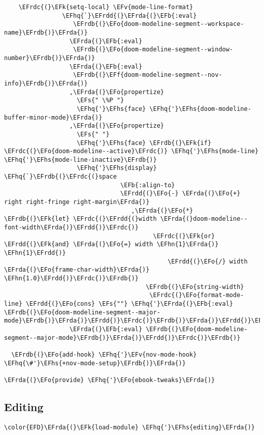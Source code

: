 \documentclass[a4wide,10pt]{article}
\newcommand{\EFs}[1]{\textcolor{EFs}{#1}} %
\newcommand{\EFk}[1]{\textcolor{EFk}{#1}} %
\newcommand{\EFb}[1]{\textcolor{EFb}{#1}} %
\newcommand{\EFf}[1]{\textcolor{EFf}{#1}} %
\newcommand{\EFv}[1]{\textcolor{EFv}{#1}} %
\newcommand{\EFo}[1]{\textcolor{EFo}{#1}} %
\newcommand{\EFhn}[1]{\textcolor{EFhn}{\textbf{#1}}} %
\newcommand{\EFhq}[1]{\textcolor{EFhq}{#1}} %
\newcommand{\EFhs}[1]{\textcolor{EFhs}{#1}} %
\newcommand{\EFrda}[1]{\textcolor{EFrda}{#1}} %
\newcommand{\EFrdb}[1]{\textcolor{EFrdb}{#1}} %
\newcommand{\EFrdc}[1]{\textcolor{EFrdc}{#1}} %
\newcommand{\EFrdd}[1]{\textcolor{EFrdd}{#1}} %
\begin{document}
\begin{Code}
\begin{Verbatim}
    \EFrdc{(}\EFk{setq-local} \EFv{mode-line-format}
                \EFhq{`}\EFrdd{(}\EFrda{(}\EFb{:eval}
                   \EFrdb{(}\EFo{doom-modeline-segment--workspace-name}\EFrdb{)}\EFrda{)}
                  \EFrda{(}\EFb{:eval}
                   \EFrdb{(}\EFo{doom-modeline-segment--window-number}\EFrdb{)}\EFrda{)}
                  \EFrda{(}\EFb{:eval}
                   \EFrdb{(}\EFf{doom-modeline-segment--nov-info}\EFrdb{)}\EFrda{)}
                  ,\EFrda{(}\EFo{propertize}
                    \EFs{" \%P "}
                    \EFhq{'}\EFhs{face} \EFhq{'}\EFhs{doom-modeline-buffer-minor-mode}\EFrda{)}
                  ,\EFrda{(}\EFo{propertize}
                    \EFs{" "}
                    \EFhq{'}\EFhs{face} \EFrdb{(}\EFk{if} \EFrdc{(}\EFo{doom-modeline--active}\EFrdc{)} \EFhq{'}\EFhs{mode-line} \EFhq{'}\EFhs{mode-line-inactive}\EFrdb{)}
                    \EFhq{'}\EFhs{display} \EFhq{`}\EFrdb{(}\EFrdc{(}space
                                \EFb{:align-to}
                                \EFrdd{(}\EFo{-} \EFrda{(}\EFo{+} right right-fringe right-margin\EFrda{)}
                                   ,\EFrda{(}\EFo{*} \EFrdb{(}\EFk{let} \EFrdc{(}\EFrdd{(}width \EFrda{(}doom-modeline--font-width\EFrda{)}\EFrdd{)}\EFrdc{)}
                                         \EFrdc{(}\EFk{or} \EFrdd{(}\EFk{and} \EFrda{(}\EFo{=} width \EFhn{1}\EFrda{)} \EFhn{1}\EFrdd{)}
                                             \EFrdd{(}\EFo{/} width \EFrda{(}\EFo{frame-char-width}\EFrda{)} \EFhn{1.0}\EFrdd{)}\EFrdc{)}\EFrdb{)}
                                       \EFrdb{(}\EFo{string-width}
                                        \EFrdc{(}\EFo{format-mode-line} \EFrdd{(}\EFo{cons} \EFs{""} \EFhq{'}\EFrda{(}\EFb{:eval} \EFrdb{(}\EFo{doom-modeline-segment--major-mode}\EFrdb{)}\EFrda{)}\EFrdd{)}\EFrdc{)}\EFrdb{)}\EFrda{)}\EFrdd{)}\EFrdc{)}\EFrdb{)}\EFrda{)}
                  \EFrda{(}\EFb{:eval} \EFrdb{(}\EFo{doom-modeline-segment--major-mode}\EFrdb{)}\EFrda{)}\EFrdd{)}\EFrdc{)}\EFrdb{)}

  \EFrdb{(}\EFo{add-hook} \EFhq{'}\EFv{nov-mode-hook} \EFhq{\#'}\EFhs{+nov-mode-setup}\EFrdb{)}\EFrda{)}

\EFrda{(}\EFo{provide} \EFhq{'}\EFo{ebook-tweaks}\EFrda{)}
\end{Verbatim}
\end{Code}
\subsection{Editing}
\label{sec:orge9548c3}
\begin{Code}
\begin{Verbatim}
\color{EFD}\EFrda{(}\EFk{load-module} \EFhq{'}\EFhs{editing}\EFrda{)}
\end{Verbatim}
\end{Code}
\end{document}
